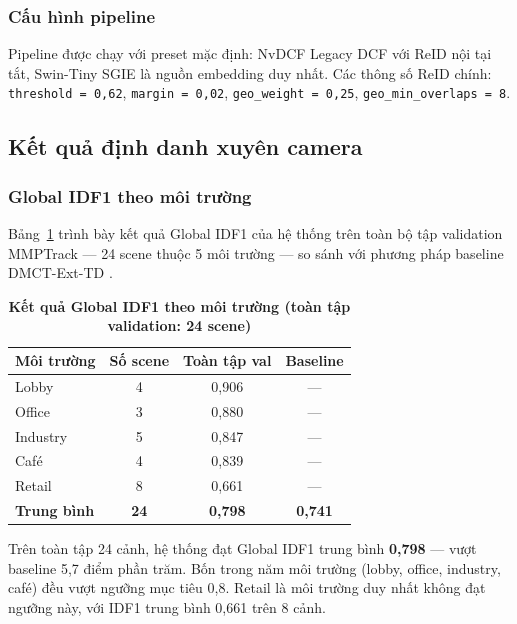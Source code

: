 \documentclass{article} %
\begin{document}
\subsubsection{Cấu hình pipeline}

Pipeline được chạy với preset mặc định: NvDCF Legacy DCF với ReID nội tại tắt, Swin-Tiny SGIE là nguồn embedding duy nhất. Các thông số ReID chính: \texttt{threshold = 0{,}62}, \texttt{margin = 0{,}02}, \texttt{geo\_weight = 0{,}25}, \texttt{geo\_min\_overlaps = 8}.

\subsection{Kết quả định danh xuyên camera}

\subsubsection{Global IDF1 theo môi trường}

Bảng~\ref{tab:results} trình bày kết quả Global IDF1 của hệ thống trên toàn bộ tập validation MMPTrack --- 24 scene thuộc 5 môi trường --- so sánh với phương pháp baseline DMCT-Ext-TD \cite{Han2022}.

\begin{table}[H]
    \centering
    \caption[Kết quả Global IDF1 theo môi trường --- toàn tập validation]{\bfseries\fontsize{12pt}{0pt}\selectfont Kết quả Global IDF1 theo môi trường (toàn tập validation: 24 scene)}
    \begin{tabular}{|l|c|c|c|}
    \hline
    \bfseries Môi trường & \bfseries Số scene & \bfseries Toàn tập val & \bfseries Baseline \cite{Han2022} \\
    \hline
    Lobby    & 4 & 0,906 & --- \\
    Office   & 3 & 0,880 & --- \\
    Industry & 5 & 0,847 & --- \\
    Café     & 4 & 0,839 & --- \\
    Retail   & 8 & 0,661 & --- \\
    \hline
    \bfseries Trung bình & \bfseries 24 & \bfseries 0,798 & \bfseries 0,741 \\
    \hline
    \end{tabular}
    \label{tab:results}
\end{table}

Trên toàn tập 24 cảnh, hệ thống đạt Global IDF1 trung bình \textbf{0,798} --- vượt baseline \cite{Han2022} 5,7 điểm phần trăm. Bốn trong năm môi trường (lobby, office, industry, café) đều vượt ngưỡng mục tiêu 0,8. Retail là môi trường duy nhất không đạt ngưỡng này, với IDF1 trung bình 0,661 trên 8 cảnh.
\end{document}
